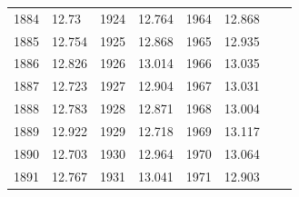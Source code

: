 \begin{description}[noitemsep]
\begin{description}[noitemsep]
\begin{table}[H]
\begin{center}
\begin{xtabular}[t]{|l|l|l|l|l|l|l|l|}
        	1884	 &
        	12.73	 &
        	1924	 &
        	12.764	 &
        	1964	 &
        	12.868	 &
        		 &
     \tabularnewline{}
        	1885	 &
        	12.754	 &
        	1925	 &
        	12.868	 &
        	1965	 &
        	12.935	 &
        		 &
     \tabularnewline{}
        	1886	 &
        	12.826	 &
        	1926	 &
        	13.014	 &
        	1966	 &
        	13.035	 &
        		 &
     \tabularnewline{}
        	1887	 &
        	12.723	 &
        	1927	 &
        	12.904	 &
        	1967	 &
        	13.031	 &
        		 &
     \tabularnewline{}
        	1888	 &
        	12.783	 &
        	1928	 &
        	12.871	 &
        	1968	 &
        	13.004	 &
        		 &
     \tabularnewline{}
        	1889	 &
        	12.922	 &
        	1929	 &
        	12.718	 &
        	1969	 &
        	13.117	 &
        		 &
     \tabularnewline{}
        	1890	 &
        	12.703	 &
        	1930	 &
        	12.964	 &
        	1970	 &
        	13.064	 &
        		 &
     \tabularnewline{}
        	1891	 &
        	12.767	 &
        	1931	 &
        	13.041	 &
        	1971	 &
        	12.903	 &
        		 &

\end{xtabular}
\end{center}
\end{table}
\end{description}
\end{description}
